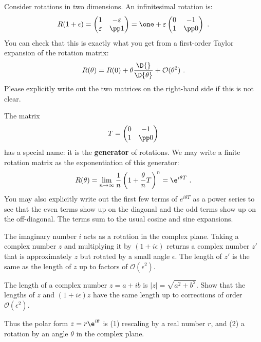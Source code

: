 \begin{example} Consider rotations in two dimensions. An infinitesimal rotation is:
\begin{align}
    R(1+\epsilon) = 
    \begin{pmatrix}
        1 & -\varepsilon \\
        \varepsilon & \pp 1
    \end{pmatrix}
    = 
    \one + \varepsilon 
    \begin{pmatrix}
        0 & - 1 \\
        1 & \pp 0
    \end{pmatrix} \ .
\end{align}
You can check that this is exactly what you get from a first-order Taylor expansion of the rotation matrix:
\begin{align}
    R(\theta) = 
    R(0)
    + \theta 
    \frac{\D{}}{\D{\theta}}  + \mathcal O(\theta^2) \ .
\end{align}
Please explicitly write out the two matrices on the right-hand side if this is not clear. 

The matrix 
\begin{align}
    T =\begin{pmatrix}
        0 & - 1 \\
        1 & \pp 0
    \end{pmatrix} 
\end{align}
has a special name: it is the \textbf{generator} of rotations. We may write a finite rotation matrix as the exponentiation of this generator:
\begin{align}
    R(\theta)  = 
    \lim_{n\to\infty} \frac{1}{n}
    \left(1+\frac{\theta}{n} T\right)^n
    = 
    \e^{i\theta T} \ .
\end{align}
You may also explicitly write out the first few terms of $e^{i\theta T}$ as a power series to see that the even terms show up on the diagonal and the odd terms show up on the off-diagonal. The terms sum to the usual cosine and sine expansions.
\end{example}

The imaginary number $i$ acts as a rotation in the complex plane. Taking a complex number $z$ and multiplying it by $(1+i\epsilon )$ returns a complex number $z'$ that is approximately $z$ but rotated by a small angle $\epsilon$. The length of $z'$ is the same as the length of $z$ up to factors of $\mathcal O(\epsilon^2)$.
\begin{exercise}
The length of a complex number $z=a+ib$ is $|z| = \sqrt{a^2 + b^2}$. Show that the lengths of $z$ and $(1+i \epsilon )z$ have the same length up to corrections of order $\mathcal O(\epsilon^2)$.
\end{exercise}
Thus the polar form $z=r\e^{i\theta}$ is (1) rescaling by a real number $r$, and (2) a rotation by an angle $\theta$ in the complex plane. 


